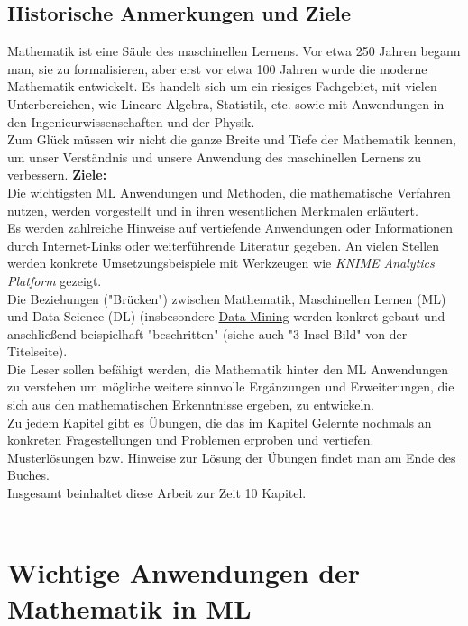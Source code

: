 \documentclass[12pt]{article}
\begin{document}
\subsection{Historische Anmerkungen und Ziele}
%
Mathematik ist eine Säule des maschinellen Lernens. Vor etwa 250 Jahren begann man, sie zu formalisieren, aber erst vor etwa 100 Jahren wurde die moderne Mathematik entwickelt. Es handelt sich um ein riesiges Fachgebiet, mit vielen Unterbereichen, wie Lineare Algebra, Statistik, etc. sowie mit Anwendungen in den Ingenieurwissenschaften und der Physik.\\
Zum Glück müssen wir nicht die ganze Breite und Tiefe der Mathematik kennen, um unser Verständnis und unsere Anwendung des maschinellen Lernens zu verbessern. 
\textbf{Ziele:}\\
Die wichtigsten ML Anwendungen und Methoden, die mathematische Verfahren nutzen, werden vorgestellt und in ihren wesentlichen Merkmalen erläutert.\\
Es werden zahlreiche Hinweise auf vertiefende Anwendungen oder Informationen durch Internet-Links oder weiterführende Literatur gegeben. An vielen Stellen werden konkrete Umsetzungsbeispiele mit Werkzeugen wie \textit{KNIME Analytics Platform} gezeigt. \\
Die Beziehungen ("Brücken") zwischen Mathematik, Maschinellen Lernen (ML) und Data Science (DL) (insbesondere \href{https://en.wikipedia.org/wiki/Data_mining}{Data Mining} werden konkret gebaut und anschließend beispielhaft "beschritten" (siehe auch "3-Insel-Bild" von der Titelseite).\\ 
Die Leser sollen befähigt werden, die Mathematik hinter den ML Anwendungen zu verstehen um mögliche weitere sinnvolle Ergänzungen und Erweiterungen, die sich aus den mathematischen Erkenntnisse ergeben, zu entwickeln.\\
Zu jedem Kapitel gibt es Übungen, die das im Kapitel Gelernte nochmals an konkreten Fragestellungen und Problemen erproben und vertiefen. Musterlösungen bzw. Hinweise zur Lösung der Übungen findet man am Ende des Buches.\\
Insgesamt beinhaltet diese Arbeit zur Zeit 10 Kapitel.\\
\\

\newpage

\section{Wichtige Anwendungen der Mathematik in ML}
\end{document}
